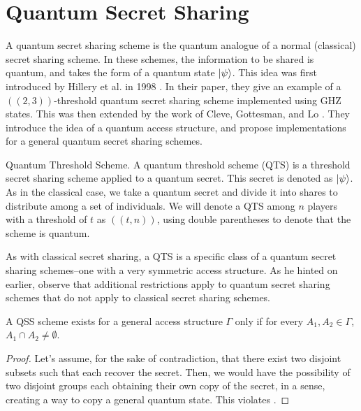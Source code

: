 \section{Quantum Secret Sharing}
\label{section:qss}

A quantum secret sharing scheme is the quantum analogue of a normal (classical) secret sharing scheme. In these schemes, the information to be shared is quantum, and takes the form of a quantum state $\ket{\psi}$. This idea was first introduced by Hillery et al. in 1998 \cite{Hillery_1999}. In their paper, they give an example of a $((2,3))$-threshold quantum secret sharing scheme implemented using GHZ states. This was then extended by the work of Cleve, Gottesman, and Lo \cite{Cleve_1999}. They introduce the idea of a quantum access structure, and propose implementations for a general quantum secret sharing schemes.

\begin{definition}{Quantum Threshold Scheme.}
    \label{defn:qts}
    A quantum threshold scheme (QTS) is a threshold secret sharing scheme applied to a quantum secret. This secret is denoted as $\ket{\psi}$. As in the classical case, we take a quantum secret and divide it into shares to distribute among a set of individuals. We will denote a QTS among $n$ players with a threshold of $t$ as $((t,n))$, using double parentheses to denote that the scheme is quantum.
\end{definition}

As with classical secret sharing, a QTS is a specific class of a quantum secret sharing schemes--one with a very symmetric access structure. As he hinted on earlier, observe that additional restrictions apply to quantum secret sharing schemes that do not apply to classical secret sharing schemes.

\begin{theorem}
    \label{thm:qss-disjoint}
    A QSS scheme exists for a general access structure $\Gamma$ only if for every $A_1, A_2 \in \Gamma$, $A_1 \cap A_2 \neq \emptyset$.
\end{theorem}

\begin{proof}
    Let's assume, for the sake of contradiction, that there exist two disjoint subsets such that each recover the secret. Then, we would have the possibility of two disjoint groups each obtaining their own copy of the secret, in a sense, creating a way to copy a general quantum state. This violates .
\end{proof}

